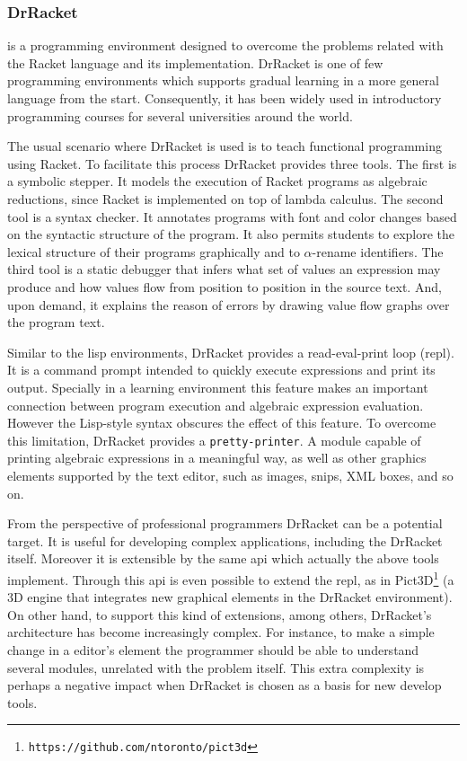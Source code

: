 \subsubsection{DrRacket~\cite{findler2002drscheme}} is a programming environment designed to overcome the problems related with the Racket language and its implementation. DrRacket is one of few programming environments which supports gradual learning in a more general language from the start. Consequently, it has been widely used in introductory programming courses for several universities around the world.

The usual scenario where DrRacket is used is to teach functional programming using Racket. To facilitate this process DrRacket provides three tools. The first is a symbolic stepper. It models the execution of Racket programs as algebraic reductions, since Racket is implemented on top of lambda calculus. The second tool is a syntax checker. It annotates programs with font and color changes based on the syntactic structure of the program. It also permits students to explore the lexical structure of their programs graphically and to $\alpha$-rename identifiers. The third tool is a static debugger that infers what set of values an expression may produce and how values flow from position to position in the source text. And, upon demand, it explains the reason of errors by drawing value flow graphs over the program text.

Similar to the lisp environments, DrRacket provides a read-eval-print loop (\ac{repl}). It is a command prompt intended to quickly execute expressions and print its output. Specially in a learning environment this feature makes an important connection between program execution and algebraic expression evaluation. However the Lisp-style syntax obscures the effect of this feature. To overcome this limitation, DrRacket provides a \texttt{pretty-printer}. A module capable of printing algebraic expressions in a meaningful way, as well as other graphics elements supported by the text editor, such as images, snips, XML boxes, and so on.

From the perspective of professional programmers DrRacket can be a potential target. It is useful for developing complex applications, including the DrRacket itself. Moreover it is extensible by the same \ac{api} which actually the above tools implement. Through this \ac{api} is even possible to extend the \ac{repl}, as in Pict3D\footnote{\texttt{https://github.com/ntoronto/pict3d}} (a 3D engine that integrates new graphical elements in the DrRacket environment). On other hand, to support this kind of extensions, among others, DrRacket's architecture has become increasingly complex. For instance, to make a simple change in a editor's element the programmer should be able to understand several modules, unrelated with the problem itself. This extra complexity is perhaps a negative impact when DrRacket is chosen as a basis for new develop tools.

